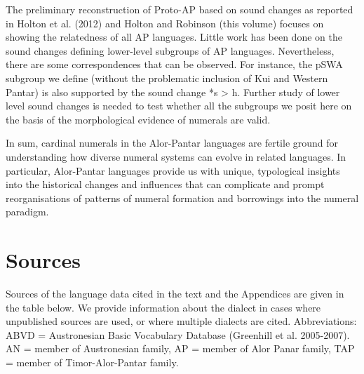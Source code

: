 The preliminary reconstruction of Proto-AP based on sound changes as reported in Holton et al. (2012) and Holton and Robinson (this volume) focuses on showing the relatedness of all AP languages. Little work has been done on the sound changes defining lower-level subgroups of AP languages. Nevertheless, there are some correspondences that can be observed. For instance, the pSWA subgroup we define (without the problematic inclusion of Kui and Western Pantar) is also supported by the sound change *s {\textgreater} h. Further study of lower level sound changes is needed to test whether all the subgroups we posit here on the basis of the morphological evidence of numerals are valid. 

In sum, cardinal numerals in the Alor-Pantar languages are fertile ground for understanding how diverse numeral systems can evolve in related languages. In particular, Alor-Pantar languages provide us with unique, typological insights into the historical changes and influences that can complicate and prompt reorganisations of patterns of numeral formation and borrowings into the numeral paradigm.

\clearpage\section[Sources ]{Sources }
Sources of the language data cited in the text and the Appendices are given in the table below. We provide information about the dialect in cases where unpublished sources are used, or where multiple dialects are cited. Abbreviations: ABVD = Austronesian Basic Vocabulary Database (Greenhill et al. 2005-2007). AN = member of Austronesian family, AP = member of Alor Panar family, TAP = member of Timor-Alor-Pantar family.

